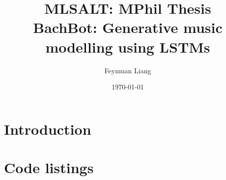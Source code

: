 \documentclass[a4paper,oneside,reqno,onecolumn]{amsart}
\newcommand{\authorname}{Feynman Liang}
\newcommand{\coursename}{MLSALT: MPhil Thesis}
\newcommand{\assignmentname}{BachBot: Generative music modelling using LSTMs}
\begin{document}
\title{\coursename\\\assignmentname}
\author{\authorname}
\address[A1]{Churchill College}
\date{\today}

\maketitle

\section{Introduction}


\nocite{*}


\onecolumn

\appendix

\section{Code listings}
\end{document}
